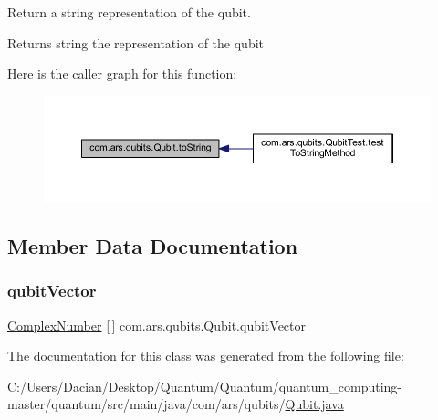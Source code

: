 Return a string representation of the qubit. \begin{DoxyReturn}{Returns}
string the representation of the qubit 
\end{DoxyReturn}
Here is the caller graph for this function\+:
\nopagebreak
\begin{figure}[H]
\begin{center}
\leavevmode
\includegraphics[width=350pt]{classcom_1_1ars_1_1qubits_1_1_qubit_abd0f4fc61885920dd3c7dde9c968a543_icgraph}
\end{center}
\end{figure}


\subsection{Member Data Documentation}
\hypertarget{classcom_1_1ars_1_1qubits_1_1_qubit_a1ba51c0cf0e774695ef15d630a5060ed}{}\label{classcom_1_1ars_1_1qubits_1_1_qubit_a1ba51c0cf0e774695ef15d630a5060ed} 
\subsubsection{\texorpdfstring{qubit\+Vector}{qubitVector}}
{\footnotesize\ttfamily \hyperlink{classcom_1_1ars_1_1complexnumbers_1_1_complex_number}{Complex\+Number} \mbox{[}$\,$\mbox{]} com.\+ars.\+qubits.\+Qubit.\+qubit\+Vector\hspace{0.3cm}{\ttfamily [protected]}}



The documentation for this class was generated from the following file\+:\begin{DoxyCompactItemize}
\item 
C\+:/\+Users/\+Dacian/\+Desktop/\+Quantum/\+Quantum/quantum\+\_\+computing-\/master/quantum/src/main/java/com/ars/qubits/\hyperlink{_qubit_8java}{Qubit.\+java}\end{DoxyCompactItemize}
